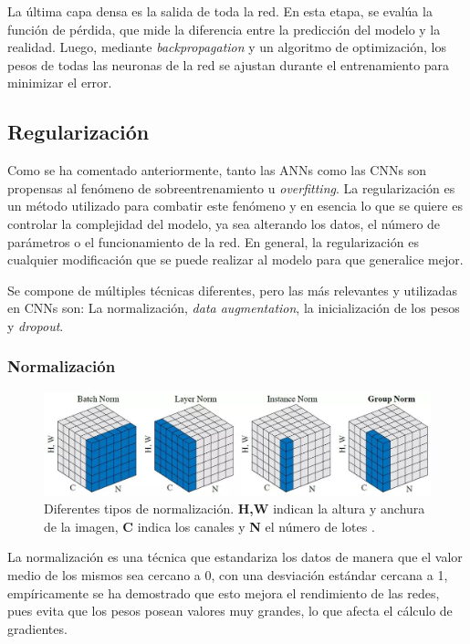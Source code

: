 La última capa densa es la salida de toda la red. En esta etapa, se evalúa la función de pérdida, que mide la diferencia entre la predicción del modelo y la realidad. Luego, mediante \textit{backpropagation} y un algoritmo de optimización, los pesos de todas las neuronas de la red se ajustan durante el entrenamiento para minimizar el error.

\subsection{Regularización}
\label{subsection:regularization}
Como se ha comentado anteriormente, tanto las ANNs como las CNNs son propensas al fenómeno de sobreentrenamiento u \textit{overfitting}. La regularización es un método utilizado para combatir este fenómeno y en esencia lo que se quiere es controlar la complejidad del modelo, ya sea alterando los datos, el número de parámetros o el funcionamiento de la red. En general, la regularización es cualquier modificación que se puede realizar al modelo para que generalice mejor.

Se compone de múltiples técnicas diferentes, pero las más relevantes y utilizadas en CNNs son: La normalización, \textit{data augmentation}, la inicialización de los pesos y \textit{dropout}.

\subsubsection{Normalización}

\begin{figure}[h]
    \centering
    \includegraphics[width=\linewidth]{figures/2_theory/normTypes.png}
    \caption[Tipos de normalización]{Diferentes tipos de normalización. \textbf{H,W} indican la altura y anchura de la imagen, \textbf{C} indica los canales y \textbf{N} el número de lotes \cite{wu2018group}.}
    \label{fig:normTypes}
\end{figure}

La normalización es una técnica que estandariza los datos de manera que el valor medio de los mismos sea cercano a 0, con una desviación estándar cercana a 1, empíricamente se ha demostrado que esto mejora el rendimiento de las redes, pues evita que los pesos posean valores muy grandes, lo que afecta el cálculo de gradientes. 

